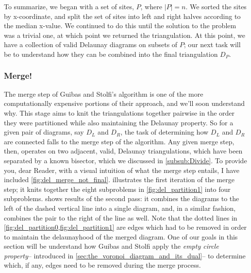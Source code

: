 \documentclass[12pt,twoside]{reedthesis}
\begin{document}
    To summarize, we began with a set of sites, $P$, where $\mid P\mid = n$. We sorted the sites by x-coordinate, and split the set of sites into left and right halves according to the median x-value. We continued to do this until the solution to the problem was a trivial one, at which point we returned the triangulation. At this point, we have a collection of valid Delaunay diagrams on subsets of $P$; our next task will be to understand how they can be combined into the final triangulation $D_{P}$.

  \subsubsection{Merge!}
  \label{ssub:merge}
    The merge step of Guibas and Stolfi's algorithm is one of the more computationally expensive portions of their approach, and we'll soon understand why. This stage aims to knit the triangulations together pairwise in the order they were partitioned while also maintaining the Delaunay property. So for a given pair of diagrams, say $D_{L}$ and $D_{R}$, the task of determining how $D_{L}$ and $D_{R}$ are connected falls to the merge step of the algorithm. Any given merge step, then, operates on two adjacent, valid, Delaunay triangulations, which have been separated by a known bisector, which we discussed in \cref{subsub:Divide}. To provide you, dear Reader, with a visual intuition of what the merge step entails, I have included \cref{fig:del_merge_not_final}.  illustrates the first iteration of the merge step; it knits together the eight subproblems in \cref{fig:del_partition1} into four subproblems.  shows results of the second pass: it combines the diagrams to the left of the dashed vertical line into a single diagram, and, in a similar fashion, combines the pair to the right of the line as well. Note that the dotted lines in \cref{fig:del_partition0,fig:del_partition1} are edges which had to be removed in order to maintain the delaunayhood of the merged diagram.  One of our goals in this section will be understand how Guibas and Stolfi apply the \emph{empty circle property}-- introduced in \cref{sec:the_voronoi_diagram_and_its_dual}-- to determine which, if any, edges need to be removed during the merge process.\par
\end{document}
